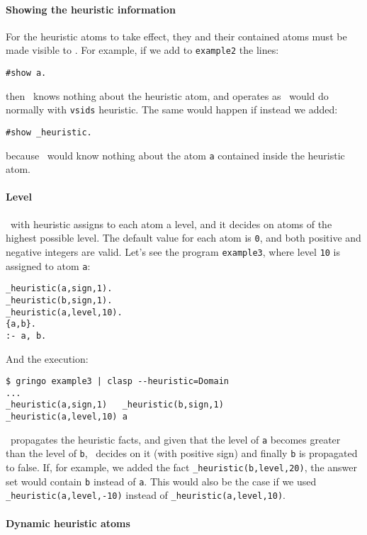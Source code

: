 \paragraph{Showing the heuristic information}

For the heuristic atoms to take effect, they and their contained atoms must be  made visible to \clasp. For example, if we add to \texttt{example2} the lines: 
\begin{verbatim}
#show a.
\end{verbatim}
then \clasp\ knows nothing about the heuristic atom, and operates as \clasp\ would do normally with \texttt{vsids} heuristic. The same would happen if instead we added:  
\begin{verbatim}
#show _heuristic.
\end{verbatim}
 because \clasp\ would know nothing about the atom \texttt{a} contained inside the heuristic atom. 

\paragraph{Level}
\clasp\ with heuristic  assigns to each atom a level, and it decides on atoms of the highest possible level. 
The default value for each atom is \texttt{0},  and both positive and negative integers are valid. 
Let's see the program \texttt{example3}, where level \texttt{10} is assigned to atom \texttt{a}: 
\begin{verbatim}
_heuristic(a,sign,1).
_heuristic(b,sign,1).
_heuristic(a,level,10).
{a,b}.
:- a, b.
\end{verbatim}
And the execution:
\begin{verbatim}
$ gringo example3 | clasp --heuristic=Domain                                                                                  
...
_heuristic(a,sign,1)   _heuristic(b,sign,1) 
_heuristic(a,level,10) a\end{verbatim}

\clasp\ propagates the heuristic facts, and given that the level of \texttt{a} becomes greater than the level of \texttt{b}, 
\clasp\ decides on it (with positive sign) and finally \texttt{b} is propagated to false. 
If, for example, we added the fact \texttt{\_heuristic(b,level,20)},  the answer set would contain \texttt{b} instead of \texttt{a}. 
This would also be the case if we used \texttt{\_heuristic(a,level,-10)} instead of \texttt{\_heuristic(a,level,10)}.  

\paragraph{Dynamic heuristic atoms}

